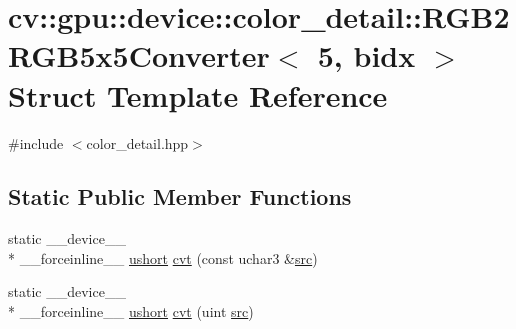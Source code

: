 \hypertarget{structcv_1_1gpu_1_1device_1_1color__detail_1_1RGB2RGB5x5Converter_3_015_00_01bidx_01_4}{\section{cv\-:\-:gpu\-:\-:device\-:\-:color\-\_\-detail\-:\-:R\-G\-B2\-R\-G\-B5x5\-Converter$<$ 5, bidx $>$ Struct Template Reference}
\label{structcv_1_1gpu_1_1device_1_1color__detail_1_1RGB2RGB5x5Converter_3_015_00_01bidx_01_4}
}


{\ttfamily \#include $<$color\-\_\-detail.\-hpp$>$}

\subsection*{Static Public Member Functions}
\begin{DoxyCompactItemize}
\item 
static \-\_\-\-\_\-device\-\_\-\-\_\- \\*
\-\_\-\-\_\-forceinline\-\_\-\-\_\- \hyperlink{core_2types__c_8h_ab95f123a6c9bcfee6a343170ef8c5f69}{ushort} \hyperlink{structcv_1_1gpu_1_1device_1_1color__detail_1_1RGB2RGB5x5Converter_3_015_00_01bidx_01_4_aeab1bdccffb1bdda534143b2701e633b}{cvt} (const uchar3 \&\hyperlink{legacy_8hpp_a371cd109b74033bc4366f584edd3dacc}{src})
\item 
static \-\_\-\-\_\-device\-\_\-\-\_\- \\*
\-\_\-\-\_\-forceinline\-\_\-\-\_\- \hyperlink{core_2types__c_8h_ab95f123a6c9bcfee6a343170ef8c5f69}{ushort} \hyperlink{structcv_1_1gpu_1_1device_1_1color__detail_1_1RGB2RGB5x5Converter_3_015_00_01bidx_01_4_a8fc9d64e1103883f8c170bf846c73880}{cvt} (uint \hyperlink{legacy_8hpp_a371cd109b74033bc4366f584edd3dacc}{src})
\end{DoxyCompactItemize}


